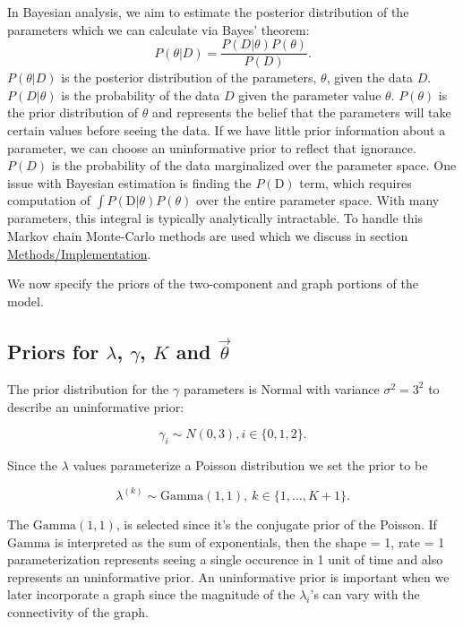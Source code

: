 \documentclass[11pt,a4paper]{article}
\begin{document}
In Bayesian analysis, we aim to estimate the posterior distribution of
the parameters which we can calculate via Bayes' theorem:
\[ P(\theta|D) = \frac{P(D|\theta)P(\theta)}{P(D)}.\] \(P(\theta|D)\) is
the posterior distribution of the parameters, \(\theta\), given the data
\(D\). \(P(D|\theta)\) is the probability of the data \(D\) given the
parameter value \(\theta\). \(P(\theta)\) is the prior distribution of
\(\theta\) and represents the belief that the parameters will take
certain values before seeing the data. If we have little prior
information about a parameter, we can choose an uninformative prior to
reflect that ignorance. \(P(D)\) is the probability of the data
marginalized over the parameter space. One issue with Bayesian
estimation is finding the \(P(\text{D})\) term, which requires
computation of \(\int P(\text{D}|\theta)P(\theta)\) over the entire
parameter space. With many parameters, this integral is typically
analytically intractable. To handle this Markov chain Monte-Carlo
methods are used which we discuss in section
\protect\hyperlink{methods}{Methods/Implementation}.

We now specify the priors of the two-component and graph portions of the
model.

\hypertarget{priors-for-lambda-gamma-k-and-vectheta}{%
\subsection{\texorpdfstring{Priors for \(\lambda\), \(\gamma\), \(K\)
and
\(\vec{\theta}\)}{Priors for \textbackslash{}lambda, \textbackslash{}gamma, K and \textbackslash{}vec\{\textbackslash{}theta\}}}\label{priors-for-lambda-gamma-k-and-vectheta}}

The prior distribution for the \(\gamma\) parameters is Normal with
variance \(\sigma^2 = 3^2\) to describe an uninformative prior:

\[\gamma_i \sim N(0, 3), i \in \{0,1,2\}.\]

Since the \(\lambda\) values parameterize a Poisson distribution we set
the prior to be

\[ \lambda^{(k)} \sim \text{Gamma}(1, 1),\ k \in \{1, \dots, K + 1\}. \]

The \(\text{Gamma}(1, 1)\), is selected since it's the conjugate prior
of the Poisson. If \(\text{Gamma}\) is interpreted as the sum of
exponentials, then the shape = 1, rate = 1 parameterization represents
seeing a single occurence in 1 unit of time and also represents an
uninformative prior. An uninformative prior is important when we later
incorporate a graph since the magnitude of the \(\lambda_i\)'s can vary
with the connectivity of the graph.
\end{document}
